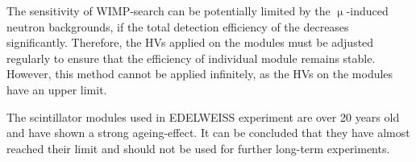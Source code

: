 The sensitivity of WIMP-search can be potentially limited by the $\upmu{}$-induced neutron backgrounds, if the total detection efficiency of the \mvs{} decreases significantly. Therefore, the HVs applied on the modules must be adjusted regularly to ensure that the efficiency of individual module remains stable. However, this method cannot be applied infinitely, as the HVs on the modules have an upper limit.

The scintillator modules used in EDELWEISS experiment are over 20 years old and have shown a strong ageing-effect. It can be concluded that they have almost reached their limit and should not be used for further long-term experiments.
